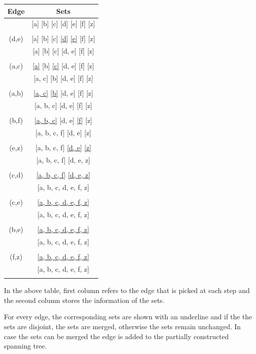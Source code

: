 \documentclass[12pt,a4paper]{article}
\begin{document}
\begin{tabular}{c|c}
    \textbf{Edge} & \textbf{Sets} \\
    \hline
    & [a] [b] [c] [d] [e] [f] [z] \\ \\
    (d,e) & [a] [b] [c] \underline{[d]} \underline{[e]} [f] [z] \\
    & [a] [b] [c] [d, e] [f] [z] \\ \\
    (a,c) & \underline{[a]} [b] \underline{[c]} [d, e] [f] [z] \\
    & [a, c] [b] [d, e] [f] [z] \\ \\
    (a,b) & \underline{[a, c]} \underline{[b]} [d, e] [f] [z] \\
    & [a, b, c] [d, e] [f] [z] \\ \\
    (b,f) & \underline{[a, b, c]} [d, e] \underline{[f]} [z] \\
    & [a, b, c, f] [d, e] [z] \\ \\
    (e,z) & [a, b, c, f] \underline{[d, e]} \underline{[z]} \\
    & [a, b, c, f] [d, e, z] \\ \\
    (c,d) & \underline{[a, b, c, f]} \underline{[d, e, z]} \\
    & [a, b, c, d, e, f, z] \\ \\
    (c,e) & \underline{[a, b, c, d, e, f, z]}\\
    & [a, b, c, d, e, f, z] \\ \\
    (b,e) & \underline{[a, b, c, d, e, f, z]}\\
    & [a, b, c, d, e, f, z] \\ \\
    (f,z) & \underline{[a, b, c, d, e, f, z]}\\
    & [a, b, c, d, e, f, z] \\ \\
\end{tabular}

In the above table, first column refers to the edge that is picked at each step and the second column stores the information of the sets.

For every edge, the corresponding sets are shown with an underline and if the the sets are disjoint, the sets are merged, otherwise the sets remain unchanged. In case the sets can be merged the edge is added to the partially constructed spanning tree.
\end{document}
